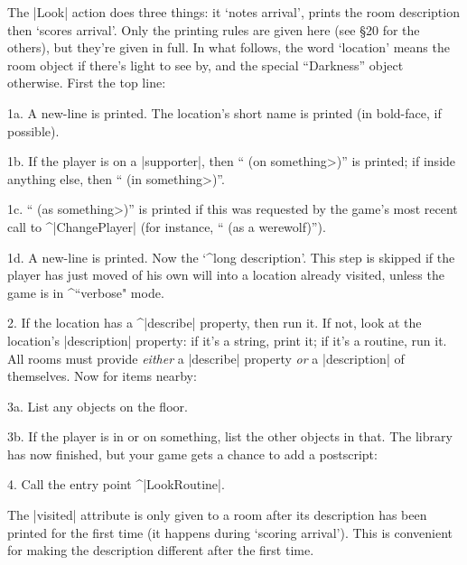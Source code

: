 \bigskip\ninepoint
\ddanger The |Look| action does three things: it `notes arrival', prints
the room description then `scores arrival'.  Only the printing rules are given
here (see \S 20 for the others), but they're given in full.  In what follows,
the word `location' means the room object if there's light to see by,
and the special ``Darkness'' object otherwise.  First the top line:
\item{1a.} A new-line is printed.  The location's short name is printed
(in bold-face, if possible).
\item{1b.} If the player is on a |supporter|, then
`` (on \<something>)'' is printed; if inside anything else, then
`` (in \<something>)''.
\item{1c.} `` (as \<something>)'' is printed if this was requested
by the game's most recent call to ^|ChangePlayer| (for instance,
`` (as a werewolf)'').
\item{1d.} A new-line is printed.
\ninepoint%
Now the `^{long description}'.  This step is skipped if the player has just
moved of his own will into a location already visited, unless the game is
in ^{``verbose"} mode.
\item{2.} If the location has a ^|describe| property, then run it.  If not,
look at the location's |description| property: if it's a string, print it;
if it's a routine, run it.
\ninepoint%
All rooms must provide {\sl either} a |describe| property {\sl or} a
|description| of themselves.  Now for items nearby:
\item{3a.} List any objects on the floor.
\item{3b.} If the player is in or on something, list the other
objects in that.
\ninepoint%
The library has now finished, but your game gets a chance to add a
postscript:
\item{4.} Call the entry point ^|LookRoutine|.

\danger The |visited| attribute is only given to a room after its description
has been printed for the first time (it happens during `scoring arrival').
This is convenient for making the description different after the first time.

